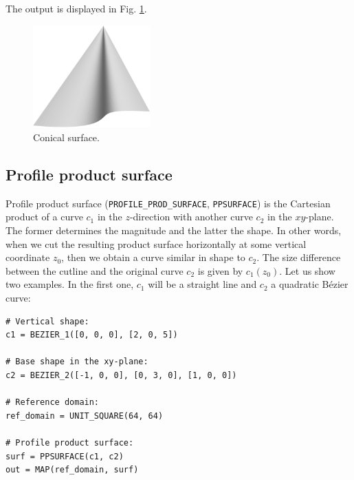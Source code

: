 \noindent
The output is displayed in Fig. \ref{fig:curves-12}.

\begin{figure}[!ht]
\begin{center}
\includegraphics[width=0.4\textwidth]{img/curves-12.png}
\end{center}
\vspace{-4mm}
\caption{Conical surface.}
\label{fig:curves-12}
\end{figure}



\subsection{Profile product surface}

Profile product surface ({\tt PROFILE\_PROD\_SURFACE}, {\tt PPSURFACE}) is the 
Cartesian product of a curve $c_1$ in the $z$-direction with another curve 
$c_2$ in the $xy$-plane. The former determines the magnitude and the latter the shape.
In other words, when we cut the resulting product surface horizontally at some 
vertical coordinate $z_0$, then we obtain a curve similar in shape to $c_2$. The 
size difference between the cutline and the original curve $c_2$ is given by 
$c_1(z_0)$. 
Let us show two examples. In the first one, $c_1$ will be a straight 
line and $c_2$ a quadratic B\'ezier curve:\\

\begin{bbox}
\begin{verbatim}
# Vertical shape:
c1 = BEZIER_1([0, 0, 0], [2, 0, 5])

# Base shape in the xy-plane:
c2 = BEZIER_2([-1, 0, 0], [0, 3, 0], [1, 0, 0])

# Reference domain:
ref_domain = UNIT_SQUARE(64, 64)

# Profile product surface: 
surf = PPSURFACE(c1, c2)
out = MAP(ref_domain, surf)
\end{verbatim}
\end{bbox}
\vspace{6mm}

